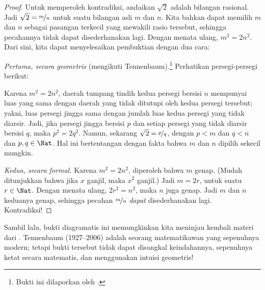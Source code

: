 \documentclass[../../../include/open-logic-section]{subfiles}
\begin{document}
\begin{proof}
Untuk memperoleh kontradiksi, andaikan $\sqrt{2}$ adalah bilangan
rasional. Jadi $\sqrt{2} = \nicefrac{m}{n}$ untuk suatu bilangan asli $m$ dan
$n$. Kita bahkan dapat memilih $m$ dan $n$ sebagai pasangan terkecil yang
mewakili rasio tersebut, sehingga pecahannya tidak dapat disederhanakan lagi.
Dengan menata ulang, $m^{2} = 2n^{2}$. Dari sini, kita
dapat menyelesaikan pembuktian dengan dua cara:

\emph{Pertama, secara geometris} (mengikuti Tennenbaum).\footnote{Bukti ini
dilaporkan oleh \cite{Conway2006}.} Perhatikan persegi-persegi berikut:
\begin{center}	
\end{center}
Karena $m^2 = 2n^2$, daerah tumpang tindih kedua persegi bersisi $n$
mempunyai luas yang sama dengan daerah yang tidak ditutupi oleh kedua
persegi tersebut; yakni, luas persegi jingga sama dengan jumlah luas kedua
persegi yang tidak diarsir. Jadi, jika persegi jingga bersisi $p$ dan setiap
persegi yang tidak diarsir bersisi $q$, maka $p^2 = 2q^2$. Namun, sekarang
$\sqrt{2} = \nicefrac{p}{q}$, dengan $p < m$ dan $q < n$ dan $p, q \in
\Nat$. Hal ini bertentangan dengan fakta bahwa $m$ dan $n$ dipilih sekecil
mungkin.
		
\emph{Kedua, secara formal.} Karena $m^{2} = 2n^{2}$, diperoleh bahwa $m$
genap. (Mudah ditunjukkan bahwa jika $x$ ganjil, maka $x^2$ ganjil.) Jadi
$m = 2r$, untuk suatu $r \in \Nat$. Dengan menata ulang, $2r^2 = n^2$,
maka $n$ juga genap. Jadi $m$ dan $n$ keduanya genap, sehingga pecahan
$\nicefrac{m}{n}$ \emph{dapat} disederhanakan lagi. Kontradiksi!
\end{proof}

Sambil lalu, bukti diagramatis ini memungkinkan kita meninjau kembali materi dari
. Tennenbaum (1927--2006) adalah seorang
matematikawan yang sepenuhnya modern; tetapi bukti tersebut tidak dapat disangkal keindahannya,
sepenuhnya ketat secara matematis, dan menggunakan intuisi geometris!
\end{document}
